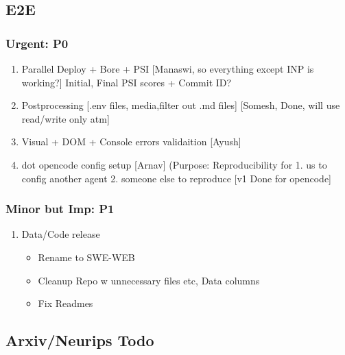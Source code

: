 \subsection{E2E}
\subsubsection{Urgent: P0}
\begin{enumerate}
    \item Parallel Deploy + Bore + PSI [Manaswi, so everything except INP is working?] Initial, Final PSI scores + Commit ID? 
    \item Postprocessing [.env files, media,filter out .md files] [Somesh, Done, will use read/write only atm]
    \item Visual + DOM + Console errors validaition [Ayush]
    \item dot opencode config setup [Arnav] (Purpose: Reproducibility for 1. us to config another agent 2. someone else to reproduce [v1 Done for opencode]
\end{enumerate}

\subsubsection{Minor but Imp: P1}
\begin{enumerate}
    \item Data/Code release
    \begin{itemize}
        \item Rename to SWE-WEB
        \item Cleanup Repo w unnecessary files etc, Data columns
        \item Fix Readmes
    \end{itemize}
\end{enumerate}

\subsection{Arxiv/Neurips Todo}

